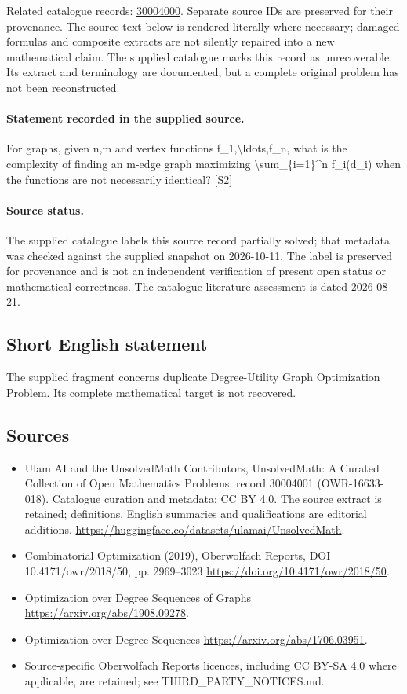 \documentclass[11pt]{article}
\begin{document}
Related catalogue records: \href{https://mehmetmars7.github.io/Erdosproblems-llm-hunter/problem.html?type=open_problems&id=30004000}{30004000}. Separate source IDs are preserved for their provenance.
The source text below is rendered literally where necessary; damaged formulas and composite extracts are not silently repaired into a new mathematical claim.
The supplied catalogue marks this record as unrecoverable. Its extract and terminology are documented, but a complete original problem has not been reconstructed.
\paragraph{Statement recorded in the supplied source.}
For graphs, given n,m and vertex functions f\_1,\textbackslash{}ldots,f\_n, what is the complexity of finding an m-edge graph maximizing \textbackslash{}sum\_\{i=1\}\textasciicircum{}n f\_i(d\_i) when the functions are not necessarily identical? \href{https://doi.org/10.4171/owr/2018/50}{[S2]}
\paragraph{Source status.}
The supplied catalogue labels this source record partially solved; that metadata was checked against the supplied snapshot on 2026-10-11. The label is preserved for provenance and is not an independent verification of present open status or mathematical correctness. The catalogue literature assessment is dated 2026-08-21.
\subsection{Short English statement}
The supplied fragment concerns duplicate Degree-Utility Graph Optimization Problem. Its complete mathematical target is not recovered.
\subsection{Sources}
\begin{itemize}
\item[S1] Ulam AI and the UnsolvedMath Contributors, UnsolvedMath: A Curated Collection of Open Mathematics Problems, record 30004001 (OWR-16633-018). Catalogue curation and metadata: CC BY 4.0. The source extract is retained; definitions, English summaries and qualifications are editorial additions.
\url{https://huggingface.co/datasets/ulamai/UnsolvedMath}.
\item[S2] Combinatorial Optimization (2019), Oberwolfach Reports, DOI 10.4171/owr/2018/50, pp. 2969--3023
\url{https://doi.org/10.4171/owr/2018/50}.
\item[S3] Optimization over Degree Sequences of Graphs
\url{https://arxiv.org/abs/1908.09278}.
\item[S4] Optimization over Degree Sequences
\url{https://arxiv.org/abs/1706.03951}.
\item Source-specific Oberwolfach Reports licences, including CC BY-SA 4.0 where applicable, are retained; see THIRD\_PARTY\_NOTICES.md.
\end{itemize}
\end{document}
